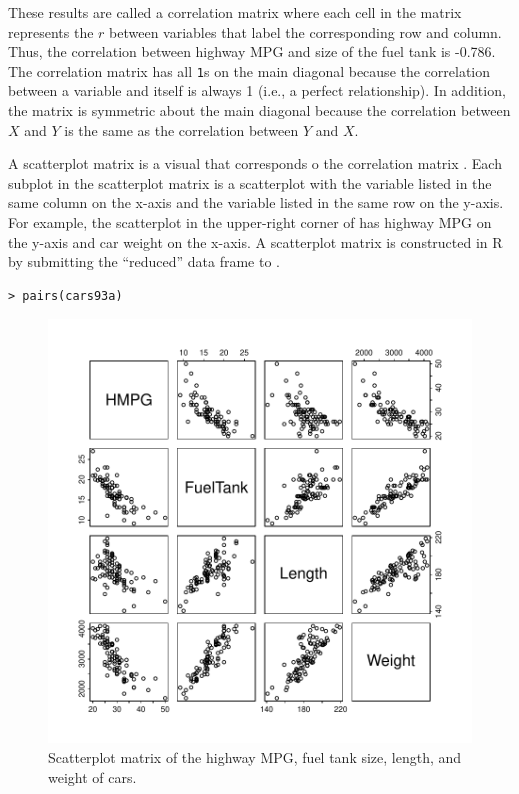 \documentclass[10pt,openany]{book}\usepackage[]{graphicx}\usepackage[]{color}
\makeatletter
\newenvironment{kframe}{%
 \def\at@end@of@kframe{}%
 \ifinner\ifhmode%
  \def\at@end@of@kframe{\end{minipage}}%
  \begin{minipage}{\columnwidth}%
 \fi\fi%
 \def\FrameCommand##1{\hskip\@totalleftmargin \hskip-\fboxsep
 \colorbox{shadecolor}{##1}\hskip-\fboxsep
     \hskip-\linewidth \hskip-\@totalleftmargin \hskip\columnwidth}%
 \MakeFramed {\advance\hsize-\width
   \@totalleftmargin\z@ \linewidth\hsize
   \@setminipage}}%
 {\par\unskip\endMakeFramed%
 \at@end@of@kframe}
\newenvironment{knitrout}{}{} %
\makeatother
\begin{document}
These results are called a correlation matrix where each cell in the matrix represents the $r$ between variables that label the corresponding row and column.  Thus, the correlation between highway MPG and size of the fuel tank is -0.786.  The correlation matrix has all \verb"1"s on the main diagonal because the correlation between a variable and itself is always 1 (i.e., a perfect relationship).  In addition, the matrix is symmetric about the main diagonal because the correlation between $X$ and $Y$ is the same as the correlation between $Y$ and $X$.


A scatterplot matrix is a visual that corresponds o the correlation matrix .  Each subplot in the scatterplot matrix is a scatterplot with the variable listed in the same column on the x-axis and the variable listed in the same row on the y-axis.  For example, the scatterplot in the upper-right corner of  has highway MPG on the y-axis and car weight on the x-axis.  A scatterplot matrix is constructed in R by submitting the ``reduced'' data frame to .

\vspace{-6pt}
\begin{knitrout}
\color{fgcolor}\begin{kframe}
\begin{verbatim}
> pairs(cars93a)
\end{verbatim}
\end{kframe}\begin{figure}[hbtp]

{\centering \includegraphics[width=.7\linewidth]{Figs/Scatplot4-1} 

}

\caption[Scatterplot matrix of the highway MPG, fuel tank size, length, and weight of cars]{Scatterplot matrix of the highway MPG, fuel tank size, length, and weight of cars.}\label{fig:Scatplot4}
\end{figure}


\end{knitrout}
\end{document}
